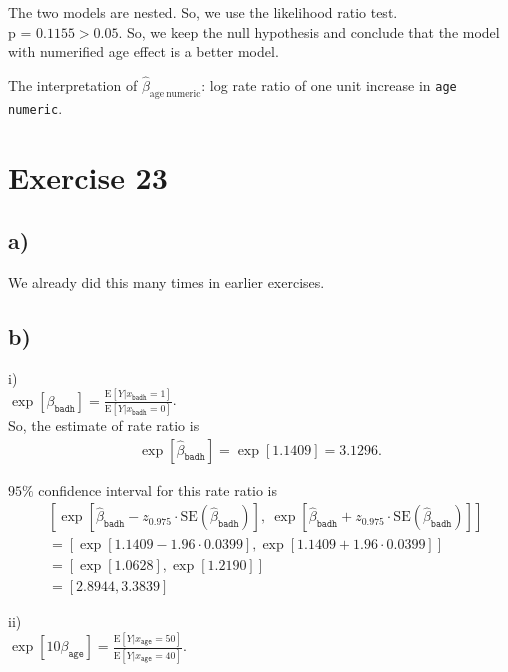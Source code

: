 \documentclass[a4paper]{article}
\newcommand{\E}{\mathrm{E}}
\begin{document}
The two models are nested. So, we use the likelihood ratio test.\\
p = $0.1155 > 0.05$. So, we keep the null hypothesis and conclude that the model with numerified age effect is a better model.

The interpretation of $\widehat{\beta}_{\mathrm{age~numeric}}$: log rate ratio of one unit increase in \texttt{age numeric}.




\vspace{\baselineskip}
\section{Exercise 23}
\subsection{a)}
We already did this many times in earlier exercises.


\vspace{\baselineskip}
\subsection{b)}
i)\\
$\exp\left[\beta_{\mathrm{\texttt{badh}}}\right] = \frac{\E\left[Y|x_{\mathrm{\texttt{badh}}} = 1\right]}{\E\left[Y|x_{\mathrm{\texttt{badh}}} = 0\right]}$.\\

So, the estimate of rate ratio is
\begin{align*}
\exp\left[\widehat{\beta}_{\mathrm{\texttt{badh}}}\right] = \exp\left[1.1409\right] = 3.1296.
\end{align*}

$95\%$ confidence interval for this rate ratio is
\begin{align*}
&\left[\exp\left[\widehat{\beta}_{\mathrm{\texttt{badh}}} - z_{0.975} \cdot \mathrm{SE}(\widehat{\beta}_{\mathrm{\texttt{badh}}})\right],~\exp\left[\widehat{\beta}_{\mathrm{\texttt{badh}}} + z_{0.975} \cdot \mathrm{SE}(\widehat{\beta}_{\mathrm{\texttt{badh}}})\right] \right]\\
&= \left[\exp[1.1409 - 1.96 \cdot 0.0399], \exp[1.1409 + 1.96 \cdot 0.0399]\right]\\
&= \left[\exp[1.0628], \exp[1.2190]\right]\\
&= [2.8944, 3.3839]
\end{align*}

ii)\\
$\exp\left[10\beta_{\mathrm{\texttt{age}}}\right] = \frac{\E\left[Y|x_{\mathrm{\texttt{age}}} = 50\right]}{\E\left[Y|x_{\mathrm{\texttt{age}}} = 40\right]}$.\\
\end{document}

